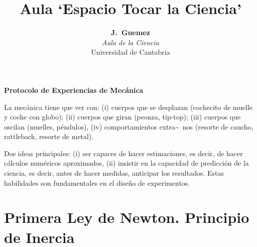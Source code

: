 \documentclass[11pt]{articulo}
\begin{document}
\title{\bf Aula `Espacio Tocar la Ciencia'} 
 \author{ {\bf J.~Guemez}\\
{\it Aula de la Ciencia}\\ Universidad de Cantabria\\
}
\maketitle

{\huge \bf Protocolo de Experiencias de Mec\'anica}
\vspace*{0.5cm}

\large 

La mec\'anica tiene que ver con: (i) cuerpos que se desplazan (cochecito de muelle y coche con globo); (ii) cuerpos que giran (peonza, tip-top); (iii) cuerpos que oscilan (muelles, p\'endulos), (iv) comportamientos extra\~~nos (resorte de caucho, rattleback, resorte de metal). 

Dos ideas principales: (i) ser capaces de hacer estimaciones, es decir, de hacer c\'alculos num\'ericos aproximados, (ii) insistir en la capacidad de predicci\'on de la ciencia, es decir, antes de hacer medidas, anticipar los resultados. Estas habilidades son fundamentales en el dise\~no de experimentos.

\section{Primera Ley de Newton. Principio de Inercia}
\end{document}
